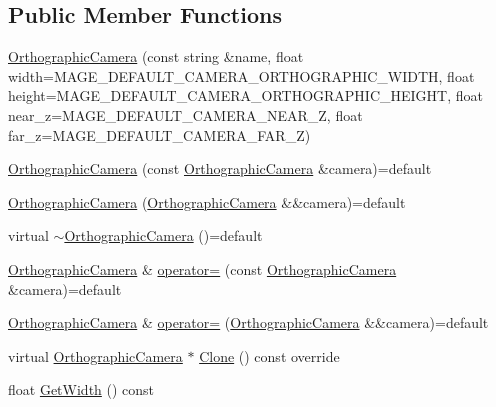 \subsection*{Public Member Functions}
\begin{DoxyCompactItemize}
\item 
\hyperlink{classmage_1_1_orthographic_camera_a071c7183ece84b94b1f658c7220deb30}{Orthographic\+Camera} (const string \&name, float width=M\+A\+G\+E\+\_\+\+D\+E\+F\+A\+U\+L\+T\+\_\+\+C\+A\+M\+E\+R\+A\+\_\+\+O\+R\+T\+H\+O\+G\+R\+A\+P\+H\+I\+C\+\_\+\+W\+I\+D\+TH, float height=M\+A\+G\+E\+\_\+\+D\+E\+F\+A\+U\+L\+T\+\_\+\+C\+A\+M\+E\+R\+A\+\_\+\+O\+R\+T\+H\+O\+G\+R\+A\+P\+H\+I\+C\+\_\+\+H\+E\+I\+G\+HT, float near\+\_\+z=M\+A\+G\+E\+\_\+\+D\+E\+F\+A\+U\+L\+T\+\_\+\+C\+A\+M\+E\+R\+A\+\_\+\+N\+E\+A\+R\+\_\+Z, float far\+\_\+z=M\+A\+G\+E\+\_\+\+D\+E\+F\+A\+U\+L\+T\+\_\+\+C\+A\+M\+E\+R\+A\+\_\+\+F\+A\+R\+\_\+Z)
\item 
\hyperlink{classmage_1_1_orthographic_camera_a0293f01356417e9f32db027ba92d6029}{Orthographic\+Camera} (const \hyperlink{classmage_1_1_orthographic_camera}{Orthographic\+Camera} \&camera)=default
\item 
\hyperlink{classmage_1_1_orthographic_camera_a6abe78fc17b583046b30a459f9ef07ef}{Orthographic\+Camera} (\hyperlink{classmage_1_1_orthographic_camera}{Orthographic\+Camera} \&\&camera)=default
\item 
virtual \hyperlink{classmage_1_1_orthographic_camera_abdad923634e17f217ba975a9149f6c57}{$\sim$\+Orthographic\+Camera} ()=default
\item 
\hyperlink{classmage_1_1_orthographic_camera}{Orthographic\+Camera} \& \hyperlink{classmage_1_1_orthographic_camera_a38631b1c377f0e3b6fa99ac5535ce226}{operator=} (const \hyperlink{classmage_1_1_orthographic_camera}{Orthographic\+Camera} \&camera)=default
\item 
\hyperlink{classmage_1_1_orthographic_camera}{Orthographic\+Camera} \& \hyperlink{classmage_1_1_orthographic_camera_a51b38eab8945fb1a2031a7ba1755d689}{operator=} (\hyperlink{classmage_1_1_orthographic_camera}{Orthographic\+Camera} \&\&camera)=default
\item 
virtual \hyperlink{classmage_1_1_orthographic_camera}{Orthographic\+Camera} $\ast$ \hyperlink{classmage_1_1_orthographic_camera_ae075c08e4af88f74212bf5c84d2e5b2a}{Clone} () const override
\item 
float \hyperlink{classmage_1_1_orthographic_camera_ac8daeca630e0f4503354e3eede7ead5c}{Get\+Width} () const
\item 

\end{DoxyCompactItemize}
